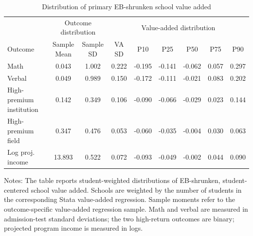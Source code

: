 \begin{table}[!htbp]
\centering
\begin{threeparttable}
\caption{Distribution of primary EB-shrunken school value added}
\label{tab:school-va-distribution}
\footnotesize
\setlength{\tabcolsep}{2pt}
\begin{tabular}{lcc|cccccc}
\toprule
 & \multicolumn{2}{c|}{Outcome distribution} & \multicolumn{6}{c}{Value-added distribution} \\
\cmidrule(lr){2-3} \cmidrule(lr){4-9}
Outcome & \shortstack{Sample\\Mean} & \shortstack{Sample\\SD} & VA SD & P10 & P25 & P50 & P75 & P90 \\
\midrule
Math & 0.043 & 1.002 & 0.222 & -0.195 & -0.141 & -0.062 & 0.057 & 0.297 \\
Verbal & 0.049 & 0.989 & 0.150 & -0.172 & -0.111 & -0.021 & 0.083 & 0.202 \\
High-premium institution & 0.142 & 0.349 & 0.106 & -0.090 & -0.066 & -0.029 & 0.023 & 0.144 \\
High-premium field & 0.347 & 0.476 & 0.053 & -0.060 & -0.035 & -0.004 & 0.030 & 0.063 \\
Log proj. income & 13.893 & 0.522 & 0.072 & -0.093 & -0.049 & -0.002 & 0.044 & 0.090 \\
\bottomrule
\end{tabular}
\begin{tablenotes}[flushleft]
\footnotesize
\item[] \parbox{0.84\textwidth}{Notes: The table reports student-weighted distributions of EB-shrunken, student-centered school value added. Schools are weighted by the number of students in the corresponding Stata value-added regression. Sample moments refer to the outcome-specific value-added regression sample. Math and verbal are measured in admission-test standard deviations; the two high-return outcomes are binary; projected program income is measured in logs.}
\end{tablenotes}
\end{threeparttable}
\end{table}
